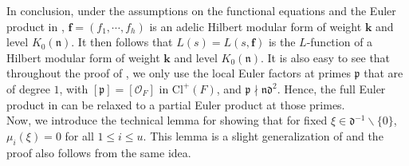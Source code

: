 \documentclass[11pt]{amsart}
\theoremstyle{remark}
\newcommand\mbf[1]{\mathbf{#1}}
\newcommand\fr[1]{\mathfrak{#1}}
\newcommand{\clo}{\mathcal{O}}
\newcommand{\bslash}{\backslash}
\newcommand{\Cl}{\mathrm{Cl}}
\begin{document}
In conclusion, under the assumptions on the functional equations and the Euler product in , $\mbf{f}=(f_1,\cdots,f_h)$ is an adelic Hilbert modular form of weight $\mbf{k}$ and level $K_0(\fr{n})$. It then follows that $L(s)=L(s,\mbf{f})$ is the $L$-function of a Hilbert modular form of weight $\mbf{k}$ and level $K_0(\fr{n})$. It is also easy to see that throughout the proof of , we only use the local Euler factors at primes $\fr{p}$ that are of degree $1$, with $[\fr{p}]=[\clo_F]$ in $\Cl^+(F)$, and $\fr{p}\nmid\fr{n}\fr{d}^2$. Hence, the full Euler product in  can be relaxed to a partial Euler product at those primes.
\\

Now, we introduce the technical lemma for showing that for fixed $\xi\in\fr{d}^{-1}\bslash\{0\}$, $\mu_i(\xi)=0$ for all $1\leq i\leq u$. This lemma is a slight generalization of \cite[Lemma~4.5]{conjhecke} and the proof also follows from the same idea.
\end{document}
